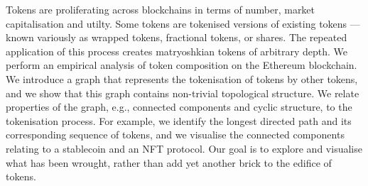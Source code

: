 Tokens are proliferating across blockchains in terms of number, market
capitalisation and utilty.  Some tokens are tokenised versions of
existing tokens --- known variously as wrapped tokens, fractional
tokens, or shares.  The repeated application of this process creates
matryoshkian tokens of arbitrary depth.  We perform an empirical
analysis of token composition on the Ethereum blockchain.  We
introduce a graph that represents the tokenisation of tokens by other
tokens, and we show that this graph contains non-trivial topological
structure.  We relate properties of the graph, e.g., connected
components and cyclic structure, to the tokenisation process.  For
example, we identify the longest directed path and its corresponding
sequence of tokens, and we visualise the connected components relating
to a stablecoin and an NFT protocol.  Our goal is to explore and
visualise what has been wrought, rather than add yet another brick to
the edifice of tokens.


